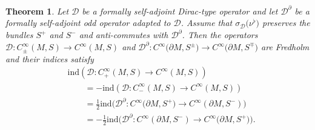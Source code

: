 \documentclass[11pt]{article}
\numberwithin{equation}{section}
\numberwithin{equation}{section}
\newtheorem{Theorem}{Theorem}[section]
\begin{document}
\begin{Theorem}\label{thm:HolIndex}
Let $\mathcal{D}$ be a formally self-adjoint Dirac-type operator and let $\mathcal{D}^\partial$ be a formally self-adjoint odd operator adapted to $\mathcal{D}$.
Assume that $\sigma_{\mathcal{D}}\big(\nu^\flat\big)$ preserves the bundles $S^+$ and $S^-$ and anti-commutes with $\mathcal{D}^\partial$.
Then the operators $\mathcal{D}\colon C^\infty_\pm(M,S)\to C^\infty(M,S)$ and $\mathcal{D}^\partial\colon C^\infty\big(\partial M,S^\pm\big)\to C^\infty\big(\partial M,S^\mp\big)$ are Fredholm and their indices satisfy
\begin{align}
&\mathrm{ind}(\mathcal{D}\colon C^\infty_+(M,S) \to C^\infty(M,S)) \nonumber \\
&\qquad=
-\mathrm{ind}(\mathcal{D}\colon C^\infty_-(M,S)\to C^\infty(M,S)) \label{eq:ind1}\\
&\qquad=
\frac{1}{2} \mathrm{ind}\big(\mathcal{D}^\partial\colon C^\infty\big(\partial M,S^+\big)\to C^\infty(\partial M,S^-)\big) \label{eq:ind2}\\
&\qquad=
-\frac{1}{2} \mathrm{ind}\big(\mathcal{D}^\partial\colon C^\infty(\partial M,S^-)\to C^\infty\big(\partial M,S^+\big)\big) .\label{eq:ind3}
\end{align}
\end{Theorem}
\end{document}

